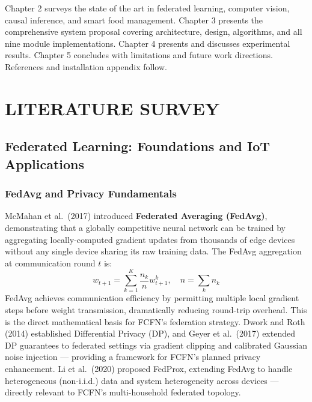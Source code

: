 \documentclass[12pt,a4paper]{report}
\begin{document}
Chapter 2 surveys the state of the art in federated learning, computer vision, causal inference, and smart food management. Chapter 3 presents the comprehensive system proposal covering architecture, design, algorithms, and all nine module implementations. Chapter 4 presents and discusses experimental results. Chapter 5 concludes with limitations and future work directions. References and installation appendix follow.

\chapter{LITERATURE SURVEY}

\section{Federated Learning: Foundations and IoT Applications}

\subsection{FedAvg and Privacy Fundamentals}
McMahan et al.\ (2017) \cite{mcmahan2017} introduced \textbf{Federated Averaging (FedAvg)}, demonstrating that a globally competitive neural network can be trained by aggregating locally-computed gradient updates from thousands of edge devices without any single device sharing its raw training data. The FedAvg aggregation at communication round $t$ is:
\begin{equation}
    w_{t+1} = \sum_{k=1}^{K} \frac{n_k}{n} w_{t+1}^k, \quad n = \sum_k n_k
\end{equation}
FedAvg achieves communication efficiency by permitting multiple local gradient steps before weight transmission, dramatically reducing round-trip overhead. This is the direct mathematical basis for FCFN's federation strategy. Dwork and Roth (2014) \cite{dwork2014} established Differential Privacy (DP), and Geyer et al.\ (2017) \cite{geyer2017} extended DP guarantees to federated settings via gradient clipping and calibrated Gaussian noise injection — providing a framework for FCFN's planned privacy enhancement. Li et al.\ (2020) \cite{li2020fedprox} proposed FedProx, extending FedAvg to handle heterogeneous (non-i.i.d.) data and system heterogeneity across devices — directly relevant to FCFN's multi-household federated topology.
\end{document}
